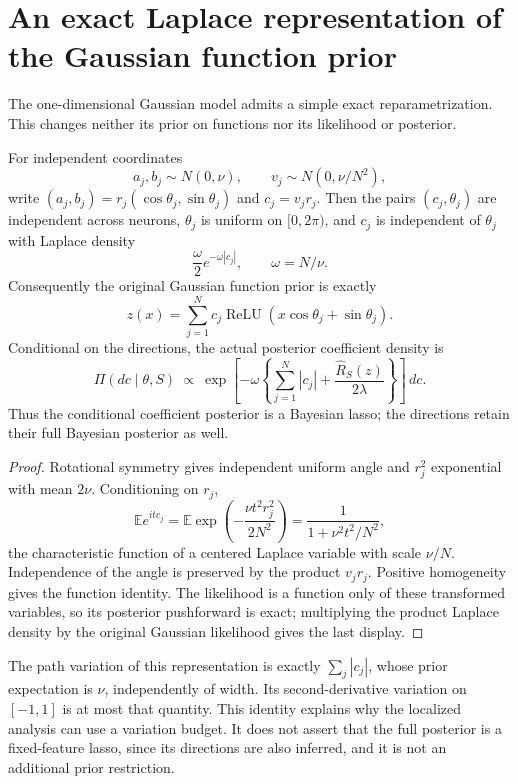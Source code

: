 \section{An exact Laplace representation of the Gaussian function prior}
\label{sec:Gaussian-Laplace}
The one-dimensional Gaussian model admits a simple exact
reparametrization. This changes neither its prior on functions nor
its likelihood or posterior.

\begin{lemma}
\label{lem:Gaussian-Laplace}
For independent coordinates
\[
 a_j,b_j\sim N(0,\nu),\qquad v_j\sim N(0,\nu/N^2),
\]
write $(a_j,b_j)=r_j(\cos\theta_j,\sin\theta_j)$ and $c_j=v_jr_j$.
Then the pairs $(c_j,\theta_j)$ are independent across neurons,
$\theta_j$ is uniform on $[0,2\pi)$, and $c_j$ is independent of
$\theta_j$ with Laplace density
\[
 \frac{\omega}{2}e^{-\omega|c_j|},
 \qquad \omega=N/\nu.
\]
Consequently the original Gaussian function prior is exactly
\[
 z(x)=\sum_{j=1}^N
        c_j\operatorname{ReLU}(x\cos\theta_j+\sin\theta_j).
\]
Conditional on the directions, the actual posterior coefficient
density is
\[
 \Pi(dc\mid\theta,S)\ \propto\
 \exp\left[-\omega\left\{
       \sum_{j=1}^N|c_j|+\frac{\widehat R_S(z)}{2\lambda}
                         \right\}\right]\,dc.
\]
Thus the conditional coefficient posterior is a Bayesian lasso;
the directions retain their full Bayesian posterior as well.
\end{lemma}
\begin{proof}
Rotational symmetry gives independent uniform angle and
$r_j^2$ exponential with mean $2\nu$. Conditioning on $r_j$,
\[
 \mathbb E e^{itc_j}
 =\mathbb E\exp\left(-\frac{\nu t^2r_j^2}{2N^2}\right)
 =\frac1{1+\nu^2t^2/N^2},
\]
the characteristic function of a centered Laplace variable with
scale $\nu/N$. Independence of the angle is preserved by the
product $v_jr_j$. Positive homogeneity gives the function identity.
The likelihood is a function only of these transformed variables,
so its posterior pushforward is exact; multiplying the product
Laplace density by the original Gaussian likelihood gives the last
display.
\end{proof}

The path variation of this representation is exactly
$\sum_j|c_j|$, whose prior expectation is $\nu$, independently of
width. Its second-derivative variation on $[-1,1]$ is at most that
quantity. This identity explains why the localized analysis can
use a variation budget. It does not assert that the full posterior
is a fixed-feature lasso, since its directions are also inferred,
and it is not an additional prior restriction.
